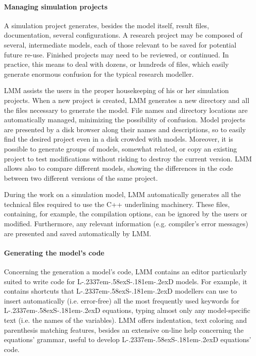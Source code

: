 \documentclass [11pt,a4paper] {book}
\def\LsD{{L\kern-.2337em\lower-.58ex\hbox{S}\kern-.181em\lower-.2ex\hbox{D}}\xspace}
\begin{document}
\paragraph{Managing simulation projects}
A simulation project generates, besides the model itself, result files, documentation, several configurations. A research project may be composed of several, intermediate models, each of those relevant to be saved for potential future re-use. Finished projects may need to be reviewed, or continued. In practice, this means to deal with dozens, or hundreds of files, which easily generate enormous confusion for the typical research modeller. 

LMM assists the users in the proper housekeeping of his or her simulation projects. When a new project is created, LMM generates a new directory and all the files necessary to generate the model. File names and directory locations are automatically managed, minimizing the possibility of confusion. Model projects are presented by a disk browser along their names and descriptions, so to easily find the desired project even in a disk crowded with models. Moreover, it is possible to generate groups of models, somewhat related, or copy an existing project to test modifications without risking to destroy the current version. LMM allows also to compare different models, showing the differences in the code between two different versions of the same project.

During the work on a simulation model, LMM automatically generates all the technical files required to use the C++ underlining machinery. These files, containing, for example, the compilation options, can be ignored by the users or modified. Furthermore, any relevant information (e.g. compiler's error messages) are presented and saved automatically by LMM.

\paragraph{Generating the model's code}

Concerning the generation a model's code, LMM contains an editor particularly suited to write code for \LsD models. For example, it contains shortcuts that \LsD modellers can use to insert automatically (i.e. error-free) all the most frequently used keywords for \LsD equations, typing almost only any model-specific text (i.e. the names of the variables).  LMM offers indentation, text coloring and parenthesis matching features, besides an extensive on-line help concerning the equations' grammar, useful to develop \LsD equations' code.
\end{document}
